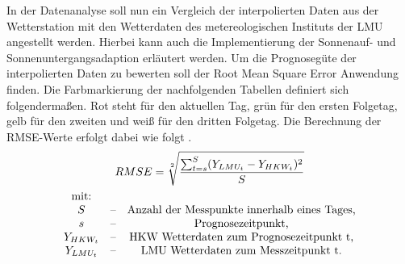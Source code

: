 In der Datenanalyse soll nun ein Vergleich der interpolierten Daten aus der Wetterstation mit den Wetterdaten des metereologischen Instituts der LMU angestellt werden. Hierbei kann auch die Implementierung der Sonnenauf- und Sonnenuntergangsadaption erläutert werden. Um die Prognosegüte der interpolierten Daten zu bewerten soll der Root Mean Square Error Anwendung finden. Die Farbmarkierung der nachfolgenden Tabellen definiert sich folgendermaßen. Rot steht für den aktuellen Tag, grün für den ersten Folgetag, gelb für den zweiten und weiß für den dritten Folgetag. Die Berechnung der RMSE-Werte erfolgt dabei wie folgt \cite{Armstrong.1992}.
\begin{gather} 
RMSE = \sqrt[2]{\frac{\sum_{t=s}^{S}(Y_{LMU_{t}}-Y_{HKW_{t}})^2}{S}}\\
\begin{matrix} 
   \text{mit:} &&\\ 
   S & \text{--} & \text{Anzahl der Messpunkte innerhalb eines Tages,} \\ 
   s & \text{--} & \text{Prognosezeitpunkt,} \\
   Y_{HKW_{t}} & \text{--} & \text{HKW Wetterdaten zum Prognosezeitpunkt t,} \\ 
   Y_{LMU_{t}} & \text{--} & \text{LMU Wetterdaten zum Messzeitpunkt t.} \\ 
\end{matrix}\notag 
\end{gather} 
